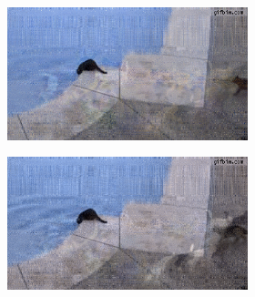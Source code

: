 \documentclass[11pt,a4paper]{article}
\begin{document}
\begin{figure}
  \centering
  \def\wid{0.48}
  \def\scal{0.44}
  \begin{subfigure}[b]{\wid\textwidth}
    \begin{subfigure}[b]{\wid\textwidth}
      \centering
      \includegraphics[keepaspectratio=true, scale=\scal]{Imgs/Cats/frame-10}
    \end{subfigure}
    
    \begin{subfigure}[b]{\wid\textwidth}
      \centering
      \includegraphics[keepaspectratio=true, scale=\scal]{Imgs/Cats/frame-11}
    \end{subfigure}
    

\end{subfigure}
\end{figure}
\end{document}

